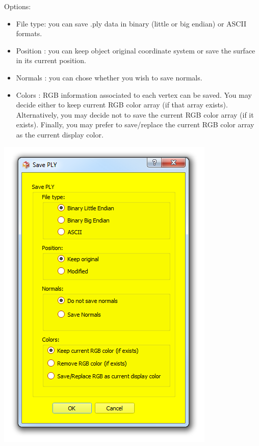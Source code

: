 \begin{minipage}{0.5\textwidth}
Options:
\begin{itemize}
\item File type: you can save .ply data in binary (little or big endian)
or ASCII formats.
\item Position : you can keep object original coordinate system or
save the surface in its current position.
\item Normals : you can chose whether you wish to save normals.
\item Colors : RGB information associated to each vertex can be saved. You may decide either to keep current RGB color array (if that array exists). Alternatively, you may decide not to save the current RGB color array (if it exists). Finally, you may prefer to save/replace the current RGB color array as the current display color.
\end{itemize}

\end{minipage}    
\begin{minipage}{0.5\textwidth}\centering
  \includegraphics[scale=0.45]{images/07/surface/save_ply.png}
 \end{minipage} 


